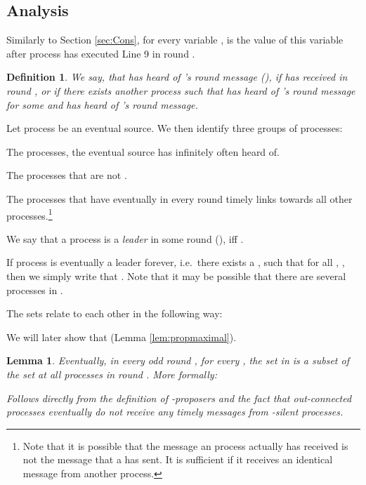 \documentclass[conference, compsoc]{IEEEtran}
\newtheorem{definition}{Definition}
\newtheorem{lemma}{Lemma}
\begin{document}
\subsection{Analysis}
Similarly to Section \ref{sec:Cons}, for every variable ,  is the value of this variable after process  has executed Line 9 in round . 
\begin{definition}
 We say, that  \emph{has heard of} 's round  message (), if  has received  in round , or if there exists another process  such that  has heard of 's round  message for some  and  has heard of 's round  message.  
\end{definition}
Let process  be an eventual source. We then identify three groups of processes:
\begin{description}[\IEEEsetlabelwidth{:}] 
 \item[:] The processes, the eventual source  has infinitely often heard of.
 \item[\textit{-silent}:] The processes that are not .
 \item[:] The  processes that have eventually in every round timely links towards all other  processes.\footnote{Note that it is possible that the message an  process actually has received is not the message that a  has sent. It is sufficient if it receives an identical message from another process.}
 \item[:] We say that a process  is a \emph{leader} in some round  (), iff . 

 If process  is eventually a leader forever, i.e.~there exists a , such that for all , , then we simply write that . Note that it may be possible that there are several processes in .
\end{description}
The sets relate to each other in the following way:

We will later show that  (Lemma \ref{lem:propmaximal}).



\begin{lemma} \label{lem:propwritten}
 Eventually, in every odd round , for every  , the set  in  is a subset of the set  at all  processes in round . More formally:
 
 \begin{IEEEproof}
  Follows directly from the definition of -proposers and the fact that out-connected processes eventually do not receive any timely messages from -silent processes.
 \end{IEEEproof}

\end{lemma}
\end{document}
